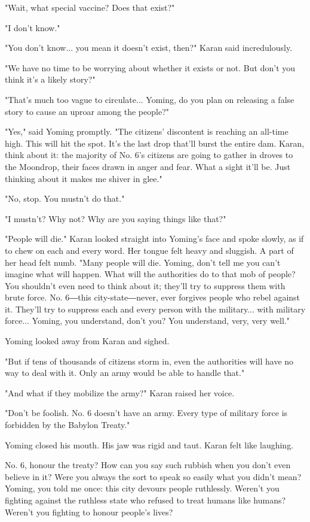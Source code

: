 "Wait, what special vaccine? Does that exist?"

"I don't know."

"You don't know... you mean it doesn't exist, then?" Karan said
incredulously.

"We have no time to be worrying about whether it exists or not. But
don't you think it's a likely story?"

"That's much too vague to circulate... Yoming, do you plan on releasing
a false story to cause an uproar among the people?"

"Yes," said Yoming promptly. "The citizens' discontent is reaching an
all-time high. This will hit the spot. It's the last drop that'll burst
the entire dam. Karan, think about it: the majority of No. 6's citizens
are going to gather in droves to the Moondrop, their faces drawn in
anger and fear. What a sight it'll be. Just thinking about it makes me
shiver in glee."

"No, stop. You mustn't do that."

"I mustn't? Why not? Why are you saying things like that?"

"People will die." Karan looked straight into Yoming's face and spoke
slowly, as if to chew on each and every word. Her tongue felt heavy and
sluggish. A part of her head felt numb. "Many people will die. Yoming,
don't tell me you can't imagine what will happen. What will the
authorities do to that mob of people? You shouldn't even need to think
about it; they'll try to suppress them with brute force. No. 6―this
city-state―never, ever forgives people who rebel against it. They'll try
to suppress each and every person with the military... with military
force... Yoming, you understand, don't you? You understand, very, very
well."

Yoming looked away from Karan and sighed.

"But if tens of thousands of citizens storm in, even the authorities
will have no way to deal with it. Only an army would be able to handle
that."

"And what if they mobilize the army?" Karan raised her voice.

"Don't be foolish. No. 6 doesn't have an army. Every type of military
force is forbidden by the Babylon Treaty."

Yoming closed his mouth. His jaw was rigid and taut. Karan felt like
laughing.

No. 6, honour the treaty? How can you say such rubbish when you don't
even believe in it? Were you always the sort to speak so easily what you
didn't mean? Yoming, you told me once: this city devours people
ruthlessly. Weren't you fighting against the ruthless state who refused
to treat humans like humans? Weren't you fighting to honour people's
lives?

